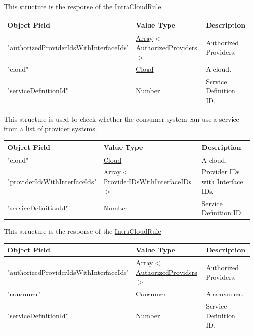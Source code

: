 \documentclass[a4paper]{arrowhead}
\newcommand{\mref}[1]{{\textcolor{ArrowheadPurple}{\hyperref[sec:model:#1]{#1}}}}
\newcommand{\pref}[1]{{\textcolor{ArrowheadGrey}{\hyperref[sec:model:primitives:#1]{#1}}}}
\begin{document}
This structure is the response of the \pref{IntraCloudRule}

\begin{table}[ht!]
\begin{tabularx}{\textwidth}{| p{6cm} | p{5cm} | X |} \hline
\rowcolor{gray!33} Object Field & Value Type      & Description \\ \hline
"authorizedProviderIdsWithInterfaceIds"  & \pref{Array}$<$\mref{AuthorizedProviders}$>$     & Authorized Providers. \\ \hline
"cloud"                   & \pref{Cloud}     & A cloud. \\ \hline
"serviceDefinitionId"                & \pref{Number}     & Service Definition ID. \\ \hline

\end{tabularx}
\end{table}


This structure is used to check whether the consumer system can use a service from a list of provider systems.

\begin{table}[ht!]
\begin{tabularx}{\textwidth}{| p{5cm} | p{6cm} | X |} \hline
\rowcolor{gray!33} Object Field & Value Type      & Description \\ \hline
"cloud"                   & \pref{Cloud}     & A cloud. \\ \hline
"providerIdsWithInterfaceIds"  & \pref{Array}$<$\mref{ProviderIDsWithInterfaceIDs}$>$     & Provider IDs with Interface IDs. \\ \hline
"serviceDefinitionId"                & \pref{Number}     & Service Definition ID. \\ \hline

\end{tabularx}
\end{table}


This structure is the response of the \pref{IntraCloudRule}

\begin{table}[ht!]
\begin{tabularx}{\textwidth}{| p{6cm} | p{5cm} | X |} \hline
\rowcolor{gray!33} Object Field & Value Type      & Description \\ \hline
"authorizedProviderIdsWithInterfaceIds"  & \pref{Array}$<$\mref{AuthorizedProviders}$>$     & Authorized Providers. \\ \hline
"consumer"                   & \pref{Consumer}     & A consumer. \\ \hline
"serviceDefinitionId"                & \pref{Number}     & Service Definition ID. \\ \hline

\end{tabularx}
\end{table}
\end{document}

